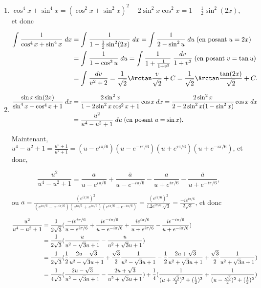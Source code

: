 {{\begin{enumerate}
Par suite,

$$\int_{}^{}\frac{\cos(3x)}{\sin x+\sin(3x)}\;dx=\ln|\sin x|-\frac{3}{4}\ln|\tan x|+C.$$

\item  $\cos^4x+\sin^4x=(\cos^2x+\sin^2x)^2-2\sin^2x\cos^2x=1-\frac{1}{2}\sin^2(2x)$, et donc

\begin{align*}\ensuremath
\int_{}^{}\frac{1}{\cos^4x+\sin^4x}\;dx&=\int_{}^{}\frac{1}{1-\frac{1}{2}\sin^2(2x)}\;dx
=\int_{}^{}\frac{1}{2-\sin^2u}\;du\;(\mbox{en posant}\;u=2x)\\
 &=\int_{}^{}\frac{1}{1+\cos^2u}\;du=\int_{}^{}\frac{1}{1+\frac{1}{1+v^2}}\;\frac{dv}{1+v^2}\;(\mbox{en posant}\;v=\tan u)\\
 &=\int_{}^{}\frac{dv}{v^2+2}=\frac{1}{\sqrt{2}}\Arctan\frac{v}{\sqrt{2}}+C
=\frac{1}{\sqrt{2}}\Arctan\frac{\tan(2x)}{\sqrt{2}}+C.
\end{align*}

\item \begin{align*}\ensuremath
\frac{\sin x\sin(2x)}{\sin^4x+\cos^4x+1}\;dx&=\frac{2\sin^2x}{1-2\sin^2x\cos^2x+1}\cos x\;dx=\frac{2\sin^2x}{2-2\sin^2x(1-\sin^2x)}\cos x\;dx\\
 &=\frac{u^2}{u^4-u^2+1}\;du\;(\mbox{en posant}\;u=\sin x).
\end{align*}

Maintenant, $u^4-u^2+1=\frac{u^6+1}{u^2+1}=(u-e^{i\pi/6})(u-e^{-i\pi/6})(u+e^{i\pi/6})(u+e^{-i\pi/6})$, et donc,

$$\frac{u^2}{u^4-u^2+1}=\frac{a}{u-e^{i\pi/6}}+\frac{\overline{a}}{u-e^{-i\pi/6}}-\frac{a}{u+e^{i\pi/6}}-\frac{\overline{a}}{u+e^{-i\pi/6}},$$

ou $a=\frac{(e^{i\pi/6})^2}{(e^{i\pi/6}-e^{-i\pi/6})(e^{i\pi/6}+e^{i\pi/6})(e^{i\pi/6}+e^{-i\pi/6})}=
\frac{(e^{i\pi/6})^2}{i.2e^{i\pi/6}.\sqrt{3}}=\frac{-ie^{i\pi/6}}{2\sqrt{3}}$, et donc

\begin{align*}\ensuremath
\frac{u^2}{u^4-u^2+1}&=\frac{1}{2\sqrt{3}}(\frac{-ie^{i\pi/6}}{u-e^{i\pi/6}}+\frac{ie^{-i\pi/6}}{u-e^{-i\pi/6}}+\frac{ie^{i\pi/6}}{u+e^{i\pi/6}}-\frac{ie^{-i\pi/6}}{u+e^{-i\pi/6}})\\
 &=\frac{1}{2\sqrt{3}}(\frac{u}{u^2-\sqrt{3}u+1}-\frac{u}{u^2+\sqrt{3}u+1})\\
 &=\frac{1}{2\sqrt{3}}(\frac{1}{2}\frac{2u-\sqrt{3}}{u^2-\sqrt{3}u+1}+\frac{\sqrt{3}}{2}\frac{1}
 {u^2-\sqrt{3}u+1}-\frac{1}{2}\frac{2u+\sqrt{3}}{u^2+\sqrt{3}u+1}+\frac{\sqrt{3}}{2}\frac{1}{u^2+\sqrt{3}u+1})\\
 &=\frac{1}{4\sqrt{3}}(\frac{2u-\sqrt{3}}{u^2-\sqrt{3}u+1}-\frac{2u+\sqrt{3}}{u^2+\sqrt{3}u+1})
 +\frac{1}{4}(\frac{1}{(u+\frac{\sqrt{3}}{2})^2+(\frac{1}{2})^2}+
 \frac{1}{(u-\frac{\sqrt{3}}{2})^2+(\frac{1}{2})^2})
\end{align*}


\end{enumerate}}}
